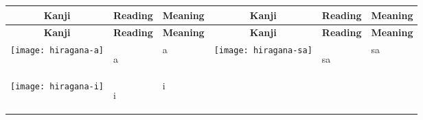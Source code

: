 \documentclass[a4paper,12pt]{extarticle}
\begin{document}
\begin{longtable}{|lll|lll|}
	\multicolumn{1}{c}{\textbf{Kanji}} & \multicolumn{1}{c}{\textbf{Reading}} & \multicolumn{1}{c}{\textbf{Meaning}}
	                                   & \multicolumn{1}{c}{\textbf{Kanji}}   & \multicolumn{1}{c}{\textbf{Reading}} & \multicolumn{1}{c}{\textbf{Meaning}}
	\\ \hline
	\endfirsthead

	\multicolumn{1}{c}{\textbf{Kanji}} & \multicolumn{1}{c}{\textbf{Reading}} & \multicolumn{1}{c}{\textbf{Meaning}}
	                                   & \multicolumn{1}{c}{\textbf{Kanji}}   & \multicolumn{1}{c}{\textbf{Reading}} & \multicolumn{1}{c}{\textbf{Meaning}}
	\\ \hline
	\endhead

	\hline
	\endfoot

	\hline \hline
	\endlastfoot

	\begin{minipage}{0.2\textwidth}
		\centerline{
			\texttt{[image: hiragana-a]}
		}
	\end{minipage}
	                                   &
	\begin{CJK}{UTF8}{min}a\end{CJK}
	                                   &
	a

	                                   &
	\begin{minipage}{0.2\textwidth}
		\centerline{
			\texttt{[image: hiragana-sa]}
		}
	\end{minipage}
	                                   &
	\begin{CJK}{UTF8}{min}sa\end{CJK}
	                                   &
	sa
	\\
	\begin{minipage}{0.2\textwidth}
		\centerline{
			\texttt{[image: hiragana-i]}
		}
	\end{minipage}
	                                   &
	\begin{CJK}{UTF8}{min}i\end{CJK}
	                                   &
	i


\end{longtable}
\end{document}

